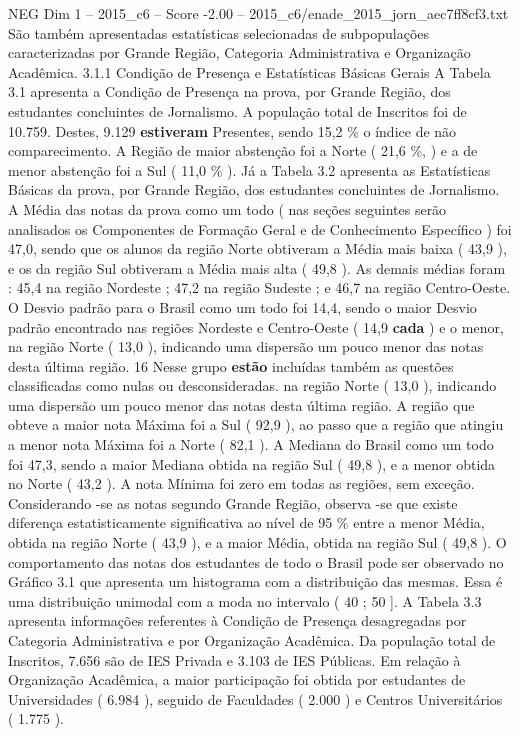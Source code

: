 \begin{textsample}{NEG Dim 1 – 2015\_c6 – Score -2.00 – 2015\_c6/enade\_2015\_jorn\_aec7ff8cf3.txt}
São também apresentadas estatísticas selecionadas de subpopulações caracterizadas por Grande Região, Categoria Administrativa e Organização Acadêmica. 3.1.1 Condição de Presença e Estatísticas Básicas Gerais A Tabela 3.1 apresenta a Condição de Presença na prova, por Grande Região, dos estudantes concluintes de Jornalismo.
A população total de Inscritos foi de 10.759.
Destes, 9.129 \textbf{estiveram} Presentes, sendo 15,2 \% o índice de não comparecimento.
A Região de maior abstenção foi a Norte ( 21,6 \%, ) e a de menor abstenção foi a Sul ( 11,0 \% ).
Já a Tabela 3.2 apresenta as Estatísticas Básicas da prova, por Grande Região, dos estudantes concluintes de Jornalismo.
A Média das notas da prova como um todo ( nas seções seguintes serão analisados os Componentes de Formação Geral e de Conhecimento Específico ) foi 47,0, sendo que os alunos da região Norte obtiveram a Média mais baixa ( 43,9 ), e os da região Sul obtiveram a Média mais alta ( 49,8 ).
As demais médias foram : 45,4 na região Nordeste ; 47,2 na região Sudeste ; e 46,7 na região Centro-Oeste.
O Desvio padrão para o Brasil como um todo foi 14,4, sendo o maior Desvio padrão encontrado nas regiões Nordeste e Centro-Oeste ( 14,9 \textbf{cada} ) e o menor, na região Norte ( 13,0 ), indicando uma dispersão um pouco menor das notas desta última região. 16 Nesse grupo \textbf{estão} incluídas também as questões classificadas como nulas ou desconsideradas. na região Norte ( 13,0 ), indicando uma dispersão um pouco menor das notas desta última região.
A região que obteve a maior nota Máxima foi a Sul ( 92,9 ), ao passo que a região que atingiu a menor nota Máxima foi a Norte ( 82,1 ).
A Mediana do Brasil como um todo foi 47,3, sendo a maior Mediana obtida na região Sul ( 49,8 ), e a menor obtida no Norte ( 43,2 ).
A nota Mínima foi zero em todas as regiões, sem exceção.
Considerando -se as notas segundo Grande Região, observa -se que existe diferença estatisticamente significativa ao nível de 95 \% entre a menor Média, obtida na região Norte ( 43,9 ), e a maior Média, obtida na região Sul ( 49,8 ).
O comportamento das notas dos estudantes de todo o Brasil pode ser observado no Gráfico 3.1 que apresenta um histograma com a distribuição das mesmas.
Essa é uma distribuição unimodal com a moda no intervalo ( 40 ; 50 ].
A Tabela 3.3 apresenta informações referentes à Condição de Presença desagregadas por Categoria Administrativa e por Organização Acadêmica.
Da população total de Inscritos, 7.656 são de IES Privada e 3.103 de IES Públicas.
Em relação à Organização Acadêmica, a maior participação foi obtida por estudantes de Universidades ( 6.984 ), seguido de Faculdades ( 2.000 ) e Centros Universitários ( 1.775 ).

\end{textsample}
